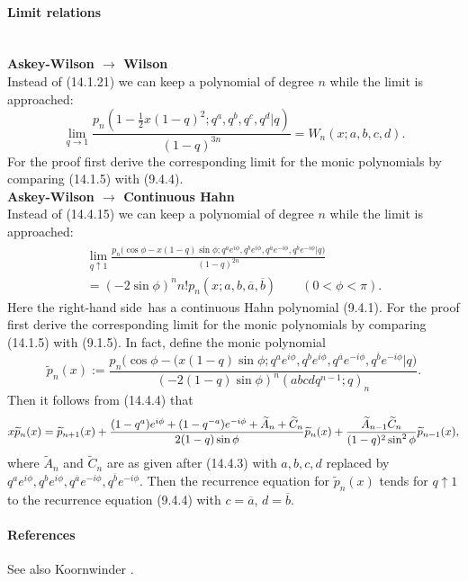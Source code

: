 \documentclass[twoside,11pt]{article}
\newcommand\sa{\smallskipamount}
\newcommand\sLP{\\[\sa]}
\newcommand\ba{\bigskipamount}
\newcommand\bLP{\\[\ba]}
\newcommand\thalf{\tfrac12}
\newcommand\wt{\widetilde}
\newcommand\RHS{right-hand side}
\begin{document}
\paragraph{Limit relations}\quad\sLP
{\bf Askey-Wilson $\longrightarrow$ Wilson}\\
Instead of (14.1.21) we can keep a polynomial of degree $n$ while the limit is approached:
\begin{equation}
\lim_{q\to1}\frac{p_n(1-\thalf x(1-q)^2;q^a,q^b,q^c,q^d |  q)}{(1-q)^{3n}}
=W_n(x;a,b,c,d).
\label{109}
\end{equation}
For the proof first derive the corresponding limit for the monic polynomials by comparing
(14.1.5) with (9.4.4).
\bLP
{\bf Askey-Wilson $\longrightarrow$ Continuous Hahn}\\
Instead of (14.4.15) we can keep a polynomial of degree $n$ while the limit is approached:
\begin{multline}
\lim_{q\uparrow1}
\frac{p_n\big(\cos\phi-x(1-q)\sin\phi;q^a e^{i\phi},q^b e^{i\phi},q^{\overline a} e^{-i\phi},
q^{\overline b} e^{-i\phi} |  q\big)}
{(1-q)^{2n}}\\
=(-2\sin\phi)^n n! p_n(x;a,b,\overline a,\overline b)\qquad
(0<\phi<\pi).
\label{177}
\end{multline}
Here the \RHS\ has a continuous Hahn polynomial (9.4.1).
For the proof first derive the corresponding limit for the monic polynomials by comparing
(14.1.5) with (9.1.5).
In fact, define the monic polynomial
\[
\wt p_n(x):=
\frac{p_n\big(\cos\phi-(x(1-q)\sin\phi;q^a e^{i\phi},q^b e^{i\phi},q^{\overline a} e^{-i\phi},
q^{\overline b} e^{-i\phi} |  q\big)}
{(-2(1-q)\sin\phi)^n (abcdq^{n-1};q)_n} .
\]
Then it follows from (14.4.4) that
\begin{equation*}
x \wt p_n(x)=\wt p_{n+1}(x)
+\frac{(1-q^a)e^{i\phi}+(1-q^{-a})e^{-i\phi}+\wt A_n+\wt C_n}{2(1-q)\sin\phi} \wt p_n(x)\\
+\frac{\wt A_{n-1} \wt C_n}{(1-q)^2 \sin^2\phi} \wt p_{n-1}(x),
\end{equation*}
where $\wt A_n$ and $\wt C_n$ are as given after (14.4.3) with $a,b,c,d$ replaced by
$q^a e^{i\phi},q^b e^{i\phi},q^{\overline a} e^{-i\phi},q^{\overline b} e^{-i\phi}$.
Then the recurrence equation for $\wt p_n(x)$ tends for $q\uparrow 1$ to
the recurrence equation (9.4.4) with $c=\overline a$, $d=\overline b$.
%
\paragraph{References}
See also Koornwinder \cite{K7}.
%
\end{document}
